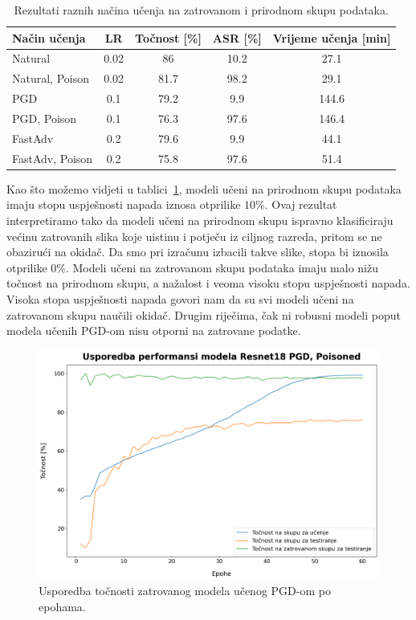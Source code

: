 \documentclass[times, utf8, zavrsni, numeric]{fer}
\begin{document}
\begin{table}[htb]
    \caption{Rezultati raznih načina učenja na zatrovanom i prirodnom skupu podataka.}
    \label{tbl:mjerenja_robusno_ucenje_zatrovano}
    \centering
    \begin{tabular}{lcccc} \hline
    Način učenja & LR & Točnost [\%] & ASR [\%] & Vrijeme učenja [min]\\ \hline
    Natural & 0.02 & 86 & 10.2 & 27.1 \\
    Natural, Poison & 0.02 & 81.7 & 98.2 & 29.1 \\
    PGD & 0.1 & 79.2 & 9.9 & 144.6 \\
    PGD, Poison & 0.1 & 76.3 & 97.6 & 146.4 \\
    FastAdv & 0.2 & 79.6 & 9.9 & 44.1 \\
    FastAdv, Poison & 0.2 & 75.8 & 97.6 & 51.4 \\ \hline
    \end{tabular}
\end{table}

\pagebreak

Kao što možemo vidjeti u tablici~\ref{tbl:mjerenja_robusno_ucenje_zatrovano}, modeli učeni na prirodnom skupu podataka imaju stopu uspješnosti napada iznosa otprilike $10\%$.
Ovaj rezultat interpretiramo tako da modeli učeni na prirodnom skupu ispravno klasificiraju većinu zatrovanih slika koje uistinu i potječu iz ciljnog razreda, pritom se ne obazirući na okidač.
Da smo pri izračunu izbacili takve slike, stopa bi iznosila otprilike 0\%.
Modeli učeni na zatrovanom skupu podataka imaju malo nižu točnost na prirodnom skupu, a nažalost i veoma visoku stopu uspješnosti napada. 
Visoka stopa uspješnosti napada govori nam da su svi modeli učeni na zatrovanom skupu naučili okidač. 
Drugim riječima, čak ni robusni modeli poput modela učenih PGD-om nisu otporni na zatrovane podatke.

\begin{figure}[htb]
    \centering
    \includegraphics[scale=0.41]{../stats/resnet18_poisoned_pgd_epochs_60_lr_0.1/stats_comparison.png}
    \caption{Usporedba točnosti zatrovanog modela učenog PGD-om po epohama.}
    \label{fig:pgd_poisoned_acc}
\end{figure}
\end{document}
